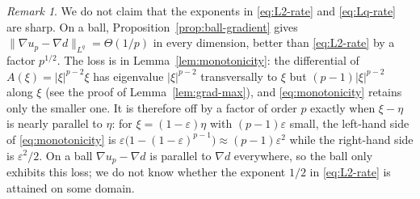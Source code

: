 \documentclass[11pt]{article}
\newcommand{\abs}[1]{\lvert #1\rvert}
\newcommand{\norm}[1]{\lVert #1\rVert}
\theoremstyle{definition}
\theoremstyle{remark}
\newtheorem{remark}[theorem]{Remark}
\begin{document}
\begin{remark}\label{rem:gradient-not-sharp}
  We do not claim that the exponents in \eqref{eq:L2-rate} and \eqref{eq:Lq-rate} are  sharp. On a ball, Proposition~\ref{prop:ball-gradient} gives
$\norm{\nabla u_p-\nabla d}_{L^q}=\Theta(1/p)$ in every dimension, better than
\eqref{eq:L2-rate} by a factor $p^{1/2}$. The loss is in
Lemma~\ref{lem:monotonicity}: the differential of $A(\xi)=\abs\xi^{p-2}\xi$
has eigenvalue $\abs\xi^{p-2}$ transversally to $\xi$ but $(p-1)\abs\xi^{p-2}$
along $\xi$ (see the proof of Lemma~\ref{lem:grad-max}), and
\eqref{eq:monotonicity} retains only the smaller one. It is therefore off by
a factor of order $p$ exactly when $\xi-\eta$ is nearly parallel to $\eta$:
for $\xi=(1-\varepsilon)\eta$ with $(p-1)\varepsilon$ small, the left-hand
side of \eqref{eq:monotonicity} is
$\varepsilon\bigl(1-(1-\varepsilon)^{p-1}\bigr)\approx(p-1)\varepsilon^{2}$
while the right-hand side is $\varepsilon^{2}/2$. On a ball $\nabla u_p-\nabla d$
is parallel to $\nabla d$ everywhere, so the ball only exhibits this loss;
we do not know whether the exponent $1/2$ in \eqref{eq:L2-rate} is attained
on some domain.
\end{remark}
\end{document}
